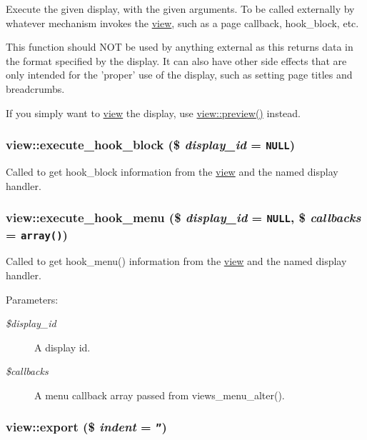 Execute the given display, with the given arguments. To be called externally by whatever mechanism invokes the \hyperlink{classview}{view}, such as a page callback, hook\_\-block, etc.

This function should NOT be used by anything external as this returns data in the format specified by the display. It can also have other side effects that are only intended for the 'proper' use of the display, such as setting page titles and breadcrumbs.

If you simply want to \hyperlink{classview}{view} the display, use \hyperlink{classview_e279461b2f1636e802587901acdf3bd2}{view::preview()} instead. \hypertarget{classview_b9c161092929bfc45d9be9e0722a37ac}{
\subsubsection[{execute\_\-hook\_\-block}]{\setlength{\rightskip}{0pt plus 5cm}view::execute\_\-hook\_\-block (\$ {\em display\_\-id} = {\tt NULL})}}
\label{classview_b9c161092929bfc45d9be9e0722a37ac}


Called to get hook\_\-block information from the \hyperlink{classview}{view} and the named display handler. \hypertarget{classview_89b35327558b4f24a6d153c683d02844}{
\subsubsection[{execute\_\-hook\_\-menu}]{\setlength{\rightskip}{0pt plus 5cm}view::execute\_\-hook\_\-menu (\$ {\em display\_\-id} = {\tt NULL}, \/  \$ {\em callbacks} = {\tt array()})}}
\label{classview_89b35327558b4f24a6d153c683d02844}


Called to get hook\_\-menu() information from the \hyperlink{classview}{view} and the named display handler.

\begin{Desc}
\item[Parameters:]
\begin{description}
\item[{\em \$display\_\-id}]A display id. \item[{\em \$callbacks}]A menu callback array passed from views\_\-menu\_\-alter(). \end{description}
\end{Desc}
\hypertarget{classview_74dee74c2fbad9c0dc3450414d80216e}{
\subsubsection[{export}]{\setlength{\rightskip}{0pt plus 5cm}view::export (\$ {\em indent} = {\tt ''})}}
\label{classview_74dee74c2fbad9c0dc3450414d80216e}


